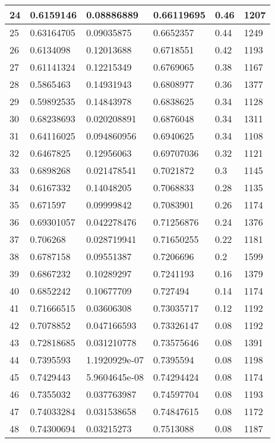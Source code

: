 \begin{longtable}{|l|l|l|l|l|l|}
24 & 0.6159146 & 0.08886889 & 0.66119695 & 0.46 & 1207 \\ \hline 
25 & 0.63164705 & 0.09035875 & 0.6652357 & 0.44 & 1249 \\ \hline 
26 & 0.6134098 & 0.12013688 & 0.6718551 & 0.42 & 1193 \\ \hline 
27 & 0.61141324 & 0.12215349 & 0.6769065 & 0.38 & 1167 \\ \hline 
28 & 0.5865463 & 0.14931943 & 0.6808977 & 0.36 & 1377 \\ \hline 
29 & 0.59892535 & 0.14843978 & 0.6838625 & 0.34 & 1128 \\ \hline 
30 & 0.68238693 & 0.020208891 & 0.6876048 & 0.34 & 1311 \\ \hline 
31 & 0.64116025 & 0.094860956 & 0.6940625 & 0.34 & 1108 \\ \hline 
32 & 0.6467825 & 0.12956063 & 0.69707036 & 0.32 & 1121 \\ \hline 
33 & 0.6898268 & 0.021478541 & 0.7021872 & 0.3 & 1145 \\ \hline 
34 & 0.6167332 & 0.14048205 & 0.7068833 & 0.28 & 1135 \\ \hline 
35 & 0.671597 & 0.09999842 & 0.7083901 & 0.26 & 1174 \\ \hline 
36 & 0.69301057 & 0.042278476 & 0.71256876 & 0.24 & 1376 \\ \hline 
37 & 0.706268 & 0.028719941 & 0.71650255 & 0.22 & 1181 \\ \hline 
38 & 0.6787158 & 0.09551387 & 0.7206696 & 0.2 & 1599 \\ \hline 
39 & 0.6867232 & 0.10289297 & 0.7241193 & 0.16 & 1379 \\ \hline 
40 & 0.6852242 & 0.10677709 & 0.727494 & 0.14 & 1174 \\ \hline 
41 & 0.71666515 & 0.03606308 & 0.73035717 & 0.12 & 1192 \\ \hline 
42 & 0.7078852 & 0.047166593 & 0.73326147 & 0.08 & 1192 \\ \hline 
43 & 0.72818685 & 0.031210778 & 0.73575646 & 0.08 & 1391 \\ \hline 
44 & 0.7395593 & 1.1920929e-07 & 0.7395594 & 0.08 & 1198 \\ \hline 
45 & 0.7429443 & 5.9604645e-08 & 0.74294424 & 0.08 & 1174 \\ \hline 
46 & 0.7355032 & 0.037763987 & 0.74597704 & 0.08 & 1193 \\ \hline 
47 & 0.74033284 & 0.031538658 & 0.74847615 & 0.08 & 1172 \\ \hline 
48 & 0.74300694 & 0.03215273 & 0.7513088 & 0.08 & 1187 \\ \hline 

\end{longtable}
